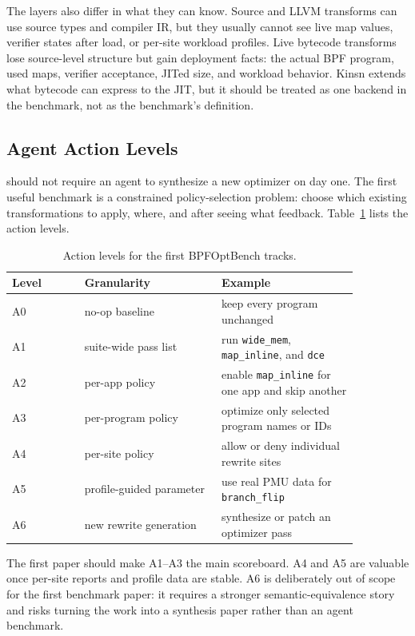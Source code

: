 The layers also differ in what they can know. Source and LLVM transforms can use source types and compiler IR, but they usually cannot see live map values, verifier states after load, or per-site workload profiles. Live bytecode transforms lose source-level structure but gain deployment facts: the actual BPF program, used maps, verifier acceptance, JITed size, and workload behavior. Kinsn extends what bytecode can express to the JIT, but it should be treated as one backend in the benchmark, not as the benchmark's definition.

\subsection{Agent Action Levels}

\sys should not require an agent to synthesize a new optimizer on day one. The first useful benchmark is a constrained policy-selection problem: choose which existing transformations to apply, where, and after seeing what feedback. Table~\ref{tab:actions} lists the action levels.

\begin{table}[t]
\small
\centering
\caption{Action levels for the first BPFOptBench tracks.}
\label{tab:actions}
\begin{tabular}{p{0.18\linewidth}p{0.34\linewidth}p{0.34\linewidth}}
\hline
Level & Granularity & Example \\
\hline
A0 & no-op baseline & keep every program unchanged \\
A1 & suite-wide pass list & run \texttt{wide\_mem}, \texttt{map\_inline}, and \texttt{dce} \\
A2 & per-app policy & enable \texttt{map\_inline} for one app and skip another \\
A3 & per-program policy & optimize only selected program names or IDs \\
A4 & per-site policy & allow or deny individual rewrite sites \\
A5 & profile-guided parameter & use real PMU data for \texttt{branch\_flip} \\
A6 & new rewrite generation & synthesize or patch an optimizer pass \\
\hline
\end{tabular}
\end{table}

The first paper should make A1--A3 the main scoreboard. A4 and A5 are valuable once per-site reports and profile data are stable. A6 is deliberately out of scope for the first benchmark paper: it requires a stronger semantic-equivalence story and risks turning the work into a synthesis paper rather than an agent benchmark.

